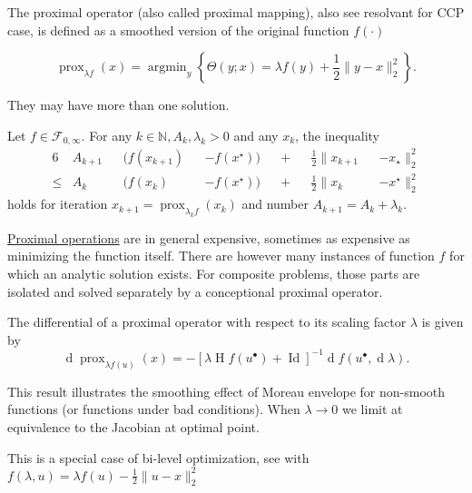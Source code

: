 \documentclass[preview, multi={definition, remark, theorem, proposition, example, literature}, border=0.2in]{standalone}
\DeclareMathOperator{\prox}{prox}
\DeclareMathOperator*{\argmin}{argmin}
\DeclareMathOperator{\id}{Id}
\DeclareMathOperator{\hessian}{H}
\DeclareMathOperator{\diff}{d}
\newcommand{\optimal}[1]{{#1^{\scriptscriptstyle\bullet}}}
\begin{document}
\begin{definition}[label=f6izn8iw, name=Proximal Operator]
	The proximal operator (also called proximal mapping), also see resolvant for CCP case, is defined as a smoothed version of the original function $f(\cdot)$

	\[
		\prox_{\lambda f}(x) = \argmin_y \left\{ \Theta(y; x) = \lambda f(y) + \frac{1}{2}\lVert y - x\rVert_2^2\right\}.
	\]
 
	They may have more than one solution. 

    \begin{theorem}[label=78req5r7, name=Convergence with Lyapunov Analysis]
        Let \( f\in\mathcal{F}_{0,\infty} \). For any \( k\in\mathbb{N}, A_k, \lambda_k > 0\) and any \( x_k \), the inequality
        \begin{alignat*}{6}
            &A_{k+1}&&(f(x_{k+1}) &&- f(x^\star)) &&+ &&\frac{1}{2}\lVert x_{k+1} &&- x_\star\rVert^2_2  \\
            \leq &A_k&&(f(x_k)   &&- f(x^\star)) &&+ &&\frac{1}{2}\lVert x_k   &&- x^\star\rVert_2^2
        \end{alignat*}
        holds for iteration \( x_{k+1} = \prox_{\lambda_kf}(x_k) \) and number \(A_{k+1}= A_k + \lambda_k\).
    \end{theorem}

    \begin{remark}[label=hnns6j86, name=Computation complexity]
	\hyperref[f6izn8iw]{Proximal operations} are in general expensive, sometimes as expensive as
        minimizing the function itself. There are however many instances of
        function \( f \) for which an analytic solution exists. For composite
        problems, those parts are isolated and solved separately by a
        conceptional proximal operator.
    \end{remark}

    \begin{remark}[label=sbkmp32j, name=Differentials of Proximals]
	The differential of a proximal operator with respect to its scaling
	factor \( \lambda \) is given by
	\[
		\diff{\prox_{\lambda f(u)}{(x)}} = -[\lambda \hessian f(\optimal{u}) +
		\id]^{-1}\diff{f(\optimal{u}, \diff\lambda)}.
	\]

	This result illustrates the smoothing effect of Moreau envelope for
	non-smooth functions (or functions under bad conditions). When
	\(\lambda \to 0\) we limit at equivalence to the Jacobian at optimal point.

	This is a special case of bi-level optimization, see \cite[Lemma
	3.2][lemma.3.2]{bilevel_diff} with \( f(\lambda, u) = \lambda f(u) - \frac{1}{2}\lVert u-x\rVert^2_2 \)
    \end{remark}
\end{definition}
\end{document}
